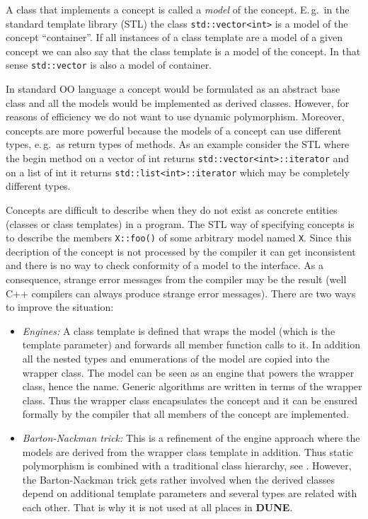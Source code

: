 \documentclass[11pt,a4paper,headinclude,footinclude,DIV16,headings=normal]{scrreprt}
\newcommand{\Dune}{{\sffamily\bfseries DUNE}\xspace}
\begin{document}
A class that implements a concept is called a
\textit{model} of the concept. E.\,g.~in the standard template library (STL)
the class \lstinline!std::vector<int>! is a model of the concept
``container''. If all instances of a class template are a model of
a given concept we can also say that the class template is a model of
the concept. In that sense \lstinline!std::vector! is also a model of
container.

In standard OO language a concept would be formulated as
an abstract base class and all the models would be implemented as
derived classes. However, for reasons of efficiency we do not want to
use dynamic polymorphism. Moreover, concepts are more powerful because
the models of a concept can use different types, e.\,g.~as return types of
methods. As an example consider the STL where the begin method on a
vector of int returns \lstinline!std::vector<int>::iterator! and on a
list of int it returns \lstinline!std::list<int>::iterator! which may
be completely different types.

Concepts are difficult to describe when they do not exist as concrete
entities (classes or class templates) in a program. The STL way of
specifying concepts is to describe the members \lstinline!X::foo()! of
some arbitrary model named \lstinline!X!. Since this decription of the
concept is not processed by the compiler it can get inconsistent and
there is no way to check conformity of a model to the interface. As a
consequence, strange error messages from the compiler may be the
result (well C++ compilers can always produce strange error messages).
There are two ways to improve the situation:
\begin{itemize}
\item \textit{Engines:} A class template is defined that wraps the
  model (which is the template parameter) and forwards all member
  function calls to it. In addition all the nested types and
  enumerations of the model are copied into the wrapper class.
  The model can be seen as an engine that powers the wrapper class,
  hence the name. Generic
  algorithms are written in terms of the wrapper class. Thus the
  wrapper class encapsulates the concept and it can be ensured
  formally by the compiler that
  all members of the concept are implemented.

\item \textit{Barton-Nackman trick:} This is a refinement of the
  engine approach where the models are derived from the wrapper class
  template in addition. Thus static polymorphism is combined
  with a traditional class hierarchy, see \cite{Veldhui99,BN}.
  However, the
  Barton-Nackman trick gets rather involved when the derived classes
  depend on additional template parameters and several types are related
  with each other. That is why it is not used at all places in \Dune.
\end{itemize}
\end{document}
